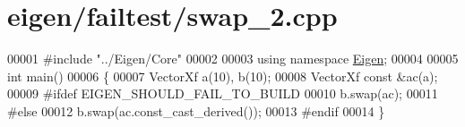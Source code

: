 \hypertarget{eigen_2failtest_2swap__2_8cpp_source}{}\section{eigen/failtest/swap\+\_\+2.cpp}
\label{eigen_2failtest_2swap__2_8cpp_source}

\begin{DoxyCode}
00001 \textcolor{preprocessor}{#include "../Eigen/Core"}
00002 
00003 \textcolor{keyword}{using namespace }\hyperlink{namespace_eigen}{Eigen};
00004 
00005 \textcolor{keywordtype}{int} main()
00006 \{
00007   VectorXf a(10), b(10);
00008   VectorXf \textcolor{keyword}{const} &ac(a);
00009 \textcolor{preprocessor}{#ifdef EIGEN\_SHOULD\_FAIL\_TO\_BUILD}
00010   b.swap(ac);
00011 \textcolor{preprocessor}{#else}
00012   b.swap(ac.const\_cast\_derived());
00013 \textcolor{preprocessor}{#endif}
00014 \textcolor{preprocessor}{\}}
\end{DoxyCode}
